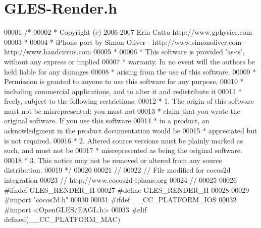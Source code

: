 \hypertarget{_g_l_e_s-_render_8h}{\section{G\-L\-E\-S-\/\-Render.h}
\label{dc/d04/_g_l_e_s-_render_8h}
}

\begin{DoxyCode}
00001 \textcolor{comment}{/*}
00002 \textcolor{comment}{* Copyright (c) 2006-2007 Erin Catto http://www.gphysics.com}
00003 \textcolor{comment}{*}
00004 \textcolor{comment}{* iPhone port by Simon Oliver - http://www.simonoliver.com - http://www.handcircus.com}
00005 \textcolor{comment}{* }
00006 \textcolor{comment}{* This software is provided 'as-is', without any express or implied}
00007 \textcolor{comment}{* warranty.  In no event will the authors be held liable for any damages}
00008 \textcolor{comment}{* arising from the use of this software.}
00009 \textcolor{comment}{* Permission is granted to anyone to use this software for any purpose,}
00010 \textcolor{comment}{* including commercial applications, and to alter it and redistribute it}
00011 \textcolor{comment}{* freely, subject to the following restrictions:}
00012 \textcolor{comment}{* 1. The origin of this software must not be misrepresented; you must not}
00013 \textcolor{comment}{* claim that you wrote the original software. If you use this software}
00014 \textcolor{comment}{* in a product, an acknowledgment in the product documentation would be}
00015 \textcolor{comment}{* appreciated but is not required.}
00016 \textcolor{comment}{* 2. Altered source versions must be plainly marked as such, and must not be}
00017 \textcolor{comment}{* misrepresented as being the original software.}
00018 \textcolor{comment}{* 3. This notice may not be removed or altered from any source distribution.}
00019 \textcolor{comment}{*/}
00020 
00021 \textcolor{comment}{//}
00022 \textcolor{comment}{// File modified for cocos2d integration}
00023 \textcolor{comment}{// http://www.cocos2d-iphone.org}
00024 \textcolor{comment}{//}
00025 
00026 \textcolor{preprocessor}{#ifndef GLES\_RENDER\_H}
00027 \textcolor{preprocessor}{}\textcolor{preprocessor}{#define GLES\_RENDER\_H}
00028 \textcolor{preprocessor}{}
00029 \textcolor{preprocessor}{#import "cocos2d.h"}
00030 
00031 \textcolor{preprocessor}{#ifdef \_\_CC\_PLATFORM\_IOS}
00032 \textcolor{preprocessor}{}\textcolor{preprocessor}{#import <OpenGLES/EAGL.h>}
00033 \textcolor{preprocessor}{#elif defined(\_\_CC\_PLATFORM\_MAC)}

\end{DoxyCode}
